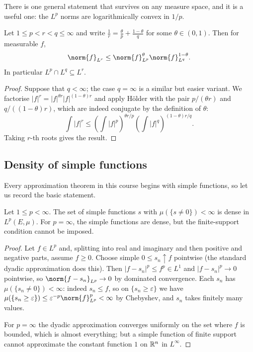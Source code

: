 \documentclass[a4paper]{scrartcl}
\begin{document}
There is one general statement that survives on any measure space, and it is a useful one: the $L^p$ norms are logarithmically convex in $1/p$.

\begin{proposition}[Interpolation]\label{prop:interp}
	Let $1 \le p < r < q \le \infty$ and write $\frac 1r = \frac{\theta}{p} + \frac{1-\theta}{q}$ for some $\theta \in (0,1)$. Then for measurable $f$,
	$$\norm{f}_{L^r} \le \norm{f}_{L^p}^{\theta} \norm{f}_{L^q}^{1-\theta}.$$
	In particular $L^p \cap L^q \subseteq L^r$.
\end{proposition}

\begin{proof}
	Suppose that $q < \infty$; the case $q = \infty$ is a similar but easier variant. We factorise $|f|^r = |f|^{\theta r} |f|^{(1-\theta)r}$ and apply H\"older with the pair $p/(\theta r)$ and $q/((1-\theta)r)$, which are indeed conjugate by the definition of $\theta$:
	$$\int |f|^r \le \left( \int |f|^p \right)^{\theta r / p} \left( \int |f|^q \right)^{(1-\theta) r/q}.$$
	Taking $r$-th roots gives the result.
\end{proof}

\subsection{Density of simple functions}

Every approximation theorem in this course begins with simple functions, so let us record the basic statement.

\begin{proposition}\label{prop:simpledense}
	Let $1 \le p < \infty$. The set of simple functions $s$ with $\mu(\{s \ne 0\}) < \infty$ is dense in $L^p(E,\mu)$. For $p = \infty$, the simple functions are dense, but the finite-support condition cannot be imposed.
\end{proposition}

\begin{proof}
	Let $f \in L^p$ and, splitting into real and imaginary and then positive and negative parts, assume $f \ge 0$. Choose simple $0 \le s_n \uparrow f$ pointwise (the standard dyadic approximation does this). Then $|f - s_n|^p \le f^p \in L^1$ and $|f-s_n|^p \to 0$ pointwise, so $\norm{f - s_n}_{L^p} \to 0$ by dominated convergence. Each $s_n$ has $\mu(\{s_n \ne 0\}) < \infty$: indeed $s_n \le f$, so on $\{s_n \ge \varepsilon\}$ we have $\mu(\{s_n \ge \varepsilon\}) \le \varepsilon^{-p}\norm{f}^p_{L^p} < \infty$ by Chebyshev, and $s_n$ takes finitely many values.

	For $p = \infty$ the dyadic approximation converges uniformly on the set where $f$ is bounded, which is almost everything; but a simple function of finite support cannot approximate the constant function $1$ on $\mathbb{R}^n$ in $L^\infty$.
\end{proof}
\end{document}
